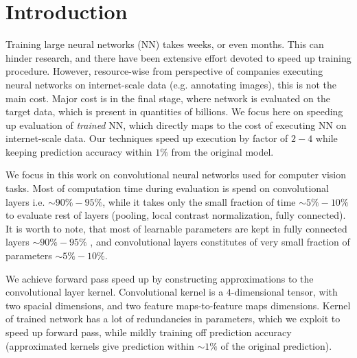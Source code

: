 \documentclass{article}
\begin{document}
 




\begin{abstract}

\end{abstract}

\section{Introduction}

Training large neural networks (NN) takes weeks, or even months. This can hinder 
research, and there have been extensive effort devoted to speed up training procedure.
However, resource-wise from perspective of companies executing neural networks on internet-scale
data (e.g. annotating images), this is not the main cost. Major cost is in the
final stage, where network is evaluated on the target data, which is present in quantities of billions.
We focus here on speeding up evaluation of \emph{trained} NN, which directly
maps to the cost of executing NN on internet-scale data. Our techniques speed up execution by 
factor of $2-4$ while keeping prediction accuracy within $1\%$ from the original model. 




We focus in this work on convolutional neural networks used for computer vision tasks. Most of
computation time during evaluation is spend on convolutional layers i.e. $\sim90\% - 95\%$, while it takes only
the small fraction of time $\sim 5\%-10\%$ to evaluate rest of layers (pooling, local contrast normalization,
fully connected). It is worth to note, that most of learnable parameters are kept in fully connected layers $\sim 90\% - 95\%$
, and convolutional layers constitutes of very small fraction of parameters $\sim 5\% - 10\%$.


We achieve forward pass speed up by constructing approximations to the convolutional layer kernel. Convolutional kernel
is a $4$-dimensional tensor, with two spacial dimensions, and two feature maps-to-feature maps dimensions. Kernel of trained
network has a lot of redundancies in parameters, which we exploit to speed up forward pass, while mildly training off
prediction accuracy (approximated kernels give prediction within $\sim 1\%$ of the original prediction).
\end{document}
